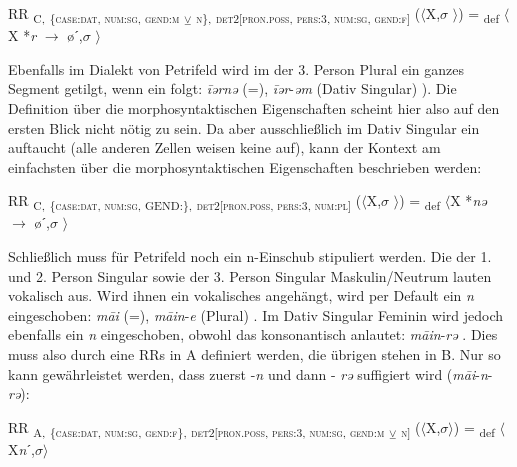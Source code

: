 \ea%
\label{ex:key:166}
 RR \textsubscript{C,} \textsubscript{\{\textsc{case:dat}, \textsc{num:sg}, \textsc{gend:m}} \textsubscript{\tiny $\veebar$}\textsubscript{ \textsc{n}\},} \textsubscript{\textsc{det2[pron.poss}, \textsc{pers:3}, \textsc{num:sg}, \textsc{gend:f}]} ($\langle$X,$\sigma$ $\rangle$) = \textsubscript{def} $\langle$X *\textit{r} $\rightarrow$ øˊ,$\sigma$ $\rangle$
\z

Ebenfalls im Dialekt von Petrifeld wird im  der 3. Person Plural ein ganzes Segment getilgt, wenn ein  folgt: \textit{\=iərnə} (=), \textit{\=iər}-\textit{əm} (Dativ Singular) \citep[65-66]{Moser1937}). Die Definition über die morphosyntaktischen Eigenschaften scheint hier also auf den ersten Blick nicht nötig zu sein. Da aber ausschließlich im Dativ Singular ein  auftaucht (alle anderen Zellen weisen keine  auf), kann der Kontext am einfachsten über die morphosyntaktischen Eigenschaften beschrieben werden:

\ea%
\label{ex:key:167}
 RR \textsubscript{C,} \textsubscript{\{\textsc{case:dat}, \textsc{num:sg}, GEND:\},} \textsubscript{\textsc{det2[pron.poss}, \textsc{pers:3}, \textsc{num:pl}]} ($\langle$X,$\sigma$ $\rangle$) = \textsubscript{def} $\langle$X *\textit{nə} $\rightarrow$ øˊ,$\sigma$ $\rangle$ \\
\z

Schließlich muss für Petrifeld noch ein n-Einschub stipuliert werden. Die  der 1. und 2. Person Singular sowie der 3. Person Singular Maskulin/Neutrum lauten vokalisch aus. Wird ihnen ein vokalisches  angehängt, wird per Default ein \textit{n} eingeschoben: \textit{m\=ai} (=), \textit{m\=ain}-\textit{e} (Plural) \citep[65]{Moser1937}. Im Dativ Singular Feminin wird jedoch ebenfalls ein \textit{n} eingeschoben, obwohl das  konsonantisch anlautet: \textit{m\=ain}-\textit{rə} \citep[65]{Moser1937}. Dies muss also durch eine RRs in  A definiert werden, die übrigen  stehen in  B. Nur so kann gewährleistet werden, dass zuerst -\textit{n} und dann - \textit{rə} suffigiert wird (\textit{m\=ai}-\textit{n}-\textit{rə}):

\ea%
\label{ex:key:168}
 RR \textsubscript{A,} \textsubscript{\{\textsc{case:dat}, \textsc{num:sg}, \textsc{gend:f}\},} \textsubscript{\textsc{det2[pron.poss}, \textsc{pers:3}, \textsc{num:sg}, \textsc{gend:m}} \textsubscript{\tiny $\veebar$}\textsubscript{ \textsc{n}]} ($\langle$X,$\sigma$$\rangle$) = \textsubscript{def} $\langle$X\textit{n}ˊ,$\sigma$$\rangle$
\z

